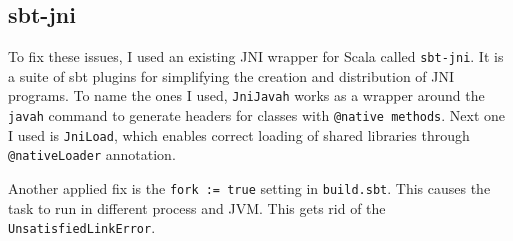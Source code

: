 \subsection{sbt-jni}
To fix these issues, I used an existing JNI wrapper for Scala called \texttt{sbt-jni}. It is a suite of sbt plugins for simplifying the creation and distribution of JNI programs. To name the ones I used, \texttt{JniJavah} works as a wrapper around the \texttt{javah} command to generate headers for classes with \texttt{@native methods}. Next one I used is \texttt{JniLoad}, which enables correct loading of shared libraries through \texttt{@nativeLoader} annotation.

Another applied fix is the \texttt{fork := true} setting in \texttt{build.sbt}. This causes the task to run in different process and JVM. This gets rid of the \texttt{UnsatisfiedLinkError}. 


